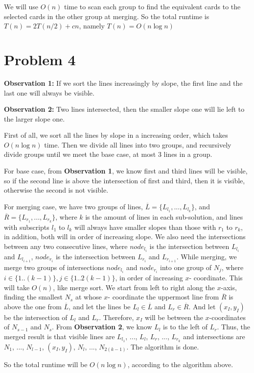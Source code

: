 \documentclass[letter,12pt]{article}
\begin{document}
We will use $O(n)$ time to scan each group to find the equivalent cards
to the selected cards in the other group at merging. So the total runtime
is $T(n) = 2T(n/2) + cn$, namely $T(n)= O(n\log n)$

\section*{Problem 4}
\textbf{Observation 1: }If we sort the lines increasingly by slope, the first
line and the last one will always be visible.

\textbf{Observation 2: }Two lines intersected, then the smaller slope one
will lie left to the larger slope one.


First of all, we sort all the lines by slope in a increasing order, which 
takes $O(n\log n)$ time. Then we divide all lines into two groups,
and recursively divide groups until we meet the base case, at most 3
lines in a group. 

For base case, from \textbf{Observation 1}, we know first and third lines
will be visible, so if the second line is above the intersection of first and
third, then it is visible, otherwise the second is not visible.

For merging case, we have two groups of lines, $\overline{L} = \{L_{l_1}, 
..., L_{l_k}\}$, and $\overline{R}=\{L_{r_1}, ..., L_{r_k}\}$, where $k$  is 
the amount of lines in each 
sub-solution, and lines with subscripts $l_1$ to $l_k$ will always have
smaller slopes than those with $r_1$ to $r_k$, in addition, both will in
order of increasing slope. We also need the intersections between any
two consecutive lines, where $node_{l_i}$ is the intersection between 
$L_{l_i}$ and $L_{l_{i+1}}$, $node_{r_i}$ is the intersection between 
$L_{r_i}$ and $L_{r_{i+1}}$. While merging, we merge two groups of 
intersections $node_{l_i}$ and $node_{r_i}$ into one group of $N_j$, 
where $i \in \{1..(k-1)\}, j \in \{1..2(k-1)\}$, in order of increasing $x$-
coordinate. This will take $O(n)$, like merge sort. We start from left to 
right along the $x$-axis, finding the smallest $N_s$ at whose $x$-
coordinate the uppermost line from $\overline{R}$ is above the one from 
$\overline{L}$, and let the lines be $L_l \in \overline{L}$ and $L_r \in 
\overline{R}$. And let $(x_I,y_I)$ be the intersection of $L_l$ and $L_r$.
Therefore, $x_I$ will be between the $x$-coordinates of $N_{s-1}$ and 
$N_s$. From \textbf{Observation 2}, we know $L_l$ is to the left of 
$L_r$. Thus, the merged result is that visible lines are $L_{l_1}$, ..., 
$L_l$, $L_r$, ..., $L_{r_k}$ and intersections are $N_1$, ..., $N_{l-1}$,
$(x_I, y_I)$, $N_{l}$, ..., $N_{2(k-1)}$. The algorithm is done.

So the total runtime will be $O(n\log n)$, according to the algorithm 
above.
\end{document}

